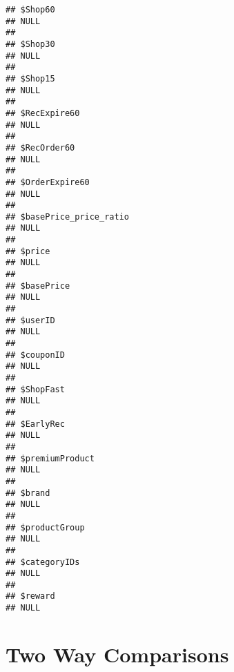 \documentclass[10pt]{report}
\newenvironment{Shaded}{}{}
\newcommand{\KeywordTok}[1]{\textcolor[rgb]{0.00,0.44,0.13}{\textbf{{#1}}}}
\newcommand{\DecValTok}[1]{\textcolor[rgb]{0.25,0.63,0.44}{{#1}}}
\newcommand{\StringTok}[1]{\textcolor[rgb]{0.25,0.44,0.63}{{#1}}}
\newcommand{\CommentTok}[1]{\textcolor[rgb]{0.38,0.63,0.69}{\textit{{#1}}}}
\newcommand{\NormalTok}[1]{{#1}}
\begin{document}
\begin{verbatim}
## $Shop60
## NULL
## 
## $Shop30
## NULL
## 
## $Shop15
## NULL
## 
## $RecExpire60
## NULL
## 
## $RecOrder60
## NULL
## 
## $OrderExpire60
## NULL
## 
## $basePrice_price_ratio
## NULL
## 
## $price
## NULL
## 
## $basePrice
## NULL
## 
## $userID
## NULL
## 
## $couponID
## NULL
## 
## $ShopFast
## NULL
## 
## $EarlyRec
## NULL
## 
## $premiumProduct
## NULL
## 
## $brand
## NULL
## 
## $productGroup
## NULL
## 
## $categoryIDs
## NULL
## 
## $reward
## NULL
\end{verbatim}

\section{Two Way Comparisons}\label{two-way-comparisons}

\begin{Shaded}
\end{Shaded}
\end{document}
